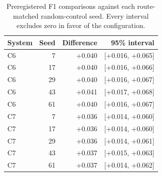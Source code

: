 \begin{table}[!t]
\caption{Preregistered F1 comparisons against each route-matched random-control seed. Every interval excludes zero in favor of the configuration.}
\label{tab:random-intervals}
\centering\footnotesize
\setlength{\tabcolsep}{3.2pt}
\begin{tabular}{@{}lrrr@{}}
\toprule
System & Seed & Difference & 95\% interval \\
\midrule
C6 & 7 & +0.040 & [+0.016, +0.065] \\
C6 & 17 & +0.040 & [+0.016, +0.066] \\
C6 & 29 & +0.040 & [+0.016, +0.067] \\
C6 & 43 & +0.041 & [+0.017, +0.068] \\
C6 & 61 & +0.040 & [+0.016, +0.067] \\
C7 & 7 & +0.036 & [+0.014, +0.060] \\
C7 & 17 & +0.036 & [+0.014, +0.060] \\
C7 & 29 & +0.036 & [+0.014, +0.061] \\
C7 & 43 & +0.037 & [+0.015, +0.063] \\
C7 & 61 & +0.037 & [+0.014, +0.062] \\
\bottomrule
\end{tabular}
\end{table}
